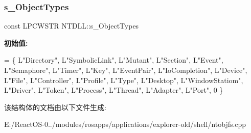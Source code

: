\subsubsection{\texorpdfstring{s\+\_\+\+Object\+Types}{s\_ObjectTypes}}
{\footnotesize\ttfamily const L\+P\+C\+W\+S\+TR N\+T\+D\+L\+L\+::s\+\_\+\+Object\+Types\hspace{0.3cm}{\ttfamily [static]}}

{\bfseries 初始值\+:}
\begin{DoxyCode}
= \{
    L\textcolor{stringliteral}{"Directory"}, L\textcolor{stringliteral}{"SymbolicLink"},
    L\textcolor{stringliteral}{"Mutant"}, L\textcolor{stringliteral}{"Section"}, L\textcolor{stringliteral}{"Event"}, L\textcolor{stringliteral}{"Semaphore"},
    L\textcolor{stringliteral}{"Timer"}, L\textcolor{stringliteral}{"Key"}, L\textcolor{stringliteral}{"EventPair"}, L\textcolor{stringliteral}{"IoCompletion"},
    L\textcolor{stringliteral}{"Device"}, L\textcolor{stringliteral}{"File"}, L\textcolor{stringliteral}{"Controller"}, L\textcolor{stringliteral}{"Profile"},
    L\textcolor{stringliteral}{"Type"}, L\textcolor{stringliteral}{"Desktop"}, L\textcolor{stringliteral}{"WindowStatiom"}, L\textcolor{stringliteral}{"Driver"},
    L\textcolor{stringliteral}{"Token"}, L\textcolor{stringliteral}{"Process"}, L\textcolor{stringliteral}{"Thread"}, L\textcolor{stringliteral}{"Adapter"}, L\textcolor{stringliteral}{"Port"},
    0
\}
\end{DoxyCode}


该结构体的文档由以下文件生成\+:\begin{DoxyCompactItemize}
\item 
E\+:/\+React\+O\+S-\/0../modules/rosapps/applications/explorer-\/old/shell/ntobjfs.\+cpp\end{DoxyCompactItemize}
